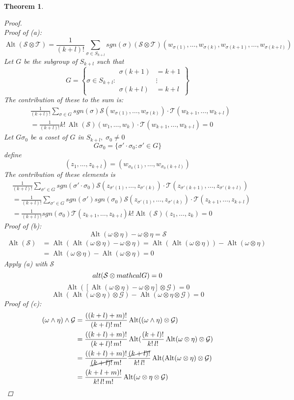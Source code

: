 \documentclass[12pt]{article}
\def\mat{\mathcal{T}}
\def\mas{\mathcal{S}}
\DeclareMathOperator{\alt}{Alt}
\newtheorem{theorem}{Theorem}[section]
\begin{document}
\begin{theorem}
\begin{proof}\quad \\
Proof of (a): 
\[\alt(\mas\otimes\mat) = \frac{1}{(k+l)!}\sum\limits_{\sigma \in S_{k+l}}sgn(\sigma)(\mas\otimes\mat)(w_{\sigma(1)}, \dots, w_{\sigma(k)}, w_{\sigma(k+1)}, \dots , w_{\sigma(k+l)})\]
Let $G$ be the subgroup of $S_{k+l}$ such that
\[G= \left\{ \sigma \in S_{k+l} : \begin{aligned} \sigma(k+1) &= k+1\\ &\vdots \\ \sigma(k+l) &= k+l \end{aligned} \right\}\]
The contribution of these to the sum is:
\begin{align*}
&\frac{1}{(k+l)!}\sum\limits_{\sigma \in G}sgn(\sigma)\mas(w_{\sigma(1)}, \dots, w_{\sigma(k)})\cdot\mat( w_{k+1}, \dots , w_{k+l})\\
&=\frac{1}{(k+l)!}k!\,\alt(\mas)(w_1, \dots, w_k)\cdot\mat( w_{k+1}, \dots , w_{k+l})=0
\end{align*}
Let $G\sigma_0$ be a coset of $G$ in $S_{k+l}, \; \sigma_0 \neq 0$
\[G\sigma_0 = \{\sigma'\cdot\sigma_0:\sigma' \in G\}\]
define 
\[(z_1, \dots, z_{k+l}) = (w_{\sigma_0(1)}, \dots , w_{\sigma_0(k+l)})\]
The contribution of these elements is
\begin{align*}
&\frac{1}{(k+l)!}\sum\limits_{\sigma' \in G}sgn(\sigma'\cdot\sigma_0)\mas(z_{\sigma'(1)}, \dots, z_{\sigma'(k)})\cdot\mat(z_{\sigma'(k+1)}, \dots, z_{\sigma'(k+l)})\\
&= \frac{1}{(k+l)!}\sum\limits_{\sigma' \in G}sgn(\sigma')sgn(\sigma_0)\mas(z_{\sigma'(1)}, \dots, z_{\sigma'(k)})\cdot\mat(z_{k+1}, \dots, z_{k+l})\\
&=\frac{1}{(k+l)!}sgn(\sigma_0)\mat(z_{k+1}, \dots, z_{k+l})k!\alt(\mas)(z_1, \dots, z_{k}) =0 
\end{align*}
Proof of (b):
\[\alt(\omega\otimes\eta) - \omega\otimes\eta =\mas\]
\begin{align*}
\alt(\mas) &= \alt(\alt(\omega\otimes\eta) - \omega\otimes\eta) = \alt(\alt(\omega\otimes\eta)) - \alt(\omega\otimes\eta)\\ &= \alt(\omega\otimes\eta) - \alt(\omega\otimes\eta) = 0 \end{align*}
Apply (a) with $\mas$
\[alt(\mas\otimes\\mathcal{G}) = 0\]
\[\alt([\alt(\omega\otimes\eta) - \omega\otimes\eta]\otimes\mathcal{G}) = 0\]
\[\alt(\alt(\omega\otimes\eta)\otimes\mathcal{G}) - \alt(\omega\otimes\eta\otimes\mathcal{G}) = 0\]
Proof of (c):
\begin{align*}
(\omega\wedge\eta)\wedge\mathcal{G} &=  \frac{((k+l)+m)!}{(k+l)!\,m!}\alt((\omega\wedge\eta)\otimes\mathcal{G})\\
&=\frac{((k+l)+m)!}{(k+l)!\,m!}\alt(\frac{(k+l)!}{k!\,l!}\alt(\omega\otimes\eta)\otimes\mathcal{G})\\
&=\frac{((k+l)+m)!}{\cancel{(k+l)!}\,m!}\frac{\cancel{(k+l)!}}{k!\,l!}\alt(\alt(\omega\otimes\eta)\otimes\mathcal{G})\\
&=  \frac{(k+l+m)!}{k!\, l!\,m!}\alt(\omega\otimes\eta\otimes\mathcal{G})
\end{align*}
\end{proof}
\end{theorem}
\end{document}
